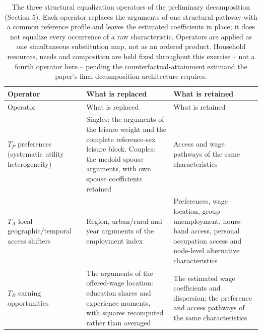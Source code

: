 \documentclass[11pt,a4paper]{article}
\begin{document}
\small\setlength{\tabcolsep}{3pt}\begin{longtable}[]{@{}
  >{\raggedright\arraybackslash}p{}
  >{\raggedright\arraybackslash}p{}
  >{\raggedright\arraybackslash}p{}@{}}
\caption{The three structural equalization operators of the preliminary decomposition (Section 5). Each operator replaces the arguments of one structural pathway with a common reference profile and leaves the estimated coefficients in place; it does not equalize every occurrence of a raw characteristic. Operators are applied as one simultaneous substitution map, not as an ordered product. Household resources, needs and composition are held fixed throughout this exercise -- not a fourth operator here -- pending the counterfactual-attainment estimand the paper's final decomposition architecture requires.}\tabularnewline
\toprule\noalign{}
\begin{minipage}[b]{\linewidth}\raggedright
Operator
\end{minipage} & \begin{minipage}[b]{\linewidth}\raggedright
What is replaced
\end{minipage} & \begin{minipage}[b]{\linewidth}\raggedright
What is retained
\end{minipage} \\
\midrule\noalign{}
\endfirsthead
\toprule\noalign{}
\begin{minipage}[b]{\linewidth}\raggedright
Operator
\end{minipage} & \begin{minipage}[b]{\linewidth}\raggedright
What is replaced
\end{minipage} & \begin{minipage}[b]{\linewidth}\raggedright
What is retained
\end{minipage} \\
\midrule\noalign{}
\endhead
\bottomrule\noalign{}
\endlastfoot
\(T_P\) preferences (systematic utility heterogeneity) & Singles: the arguments of the leisure weight and the complete reference-sex leisure block. Couples: the medoid spouse arguments, with own spouse coefficients retained & Access and wage pathways of the same characteristics \\
\(T_A\) local geographic/temporal access shifters & Region, urban/rural and year arguments of the employment index & Preferences, wage location, group unemployment, hours-band access, personal occupation access and node-level alternative characteristics \\
\(T_B\) earning opportunities & The arguments of the offered-wage location: education shares and experience moments, with squares recomputed rather than averaged & The estimated wage coefficients and dispersion; the preference and access pathways of the same characteristics \\
\end{longtable}
\end{document}

